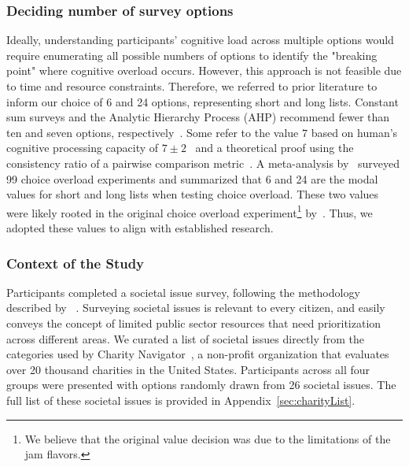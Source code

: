 \subsubsection{Deciding number of survey options}
Ideally, understanding participants' cognitive load across multiple options would require enumerating all possible numbers of options to identify the "breaking point" where cognitive overload occurs. However, this approach is not feasible due to time and resource constraints. Therefore, we referred to prior literature to inform our choice of 6 and 24 options, representing short and long lists. Constant sum surveys and the Analytic Hierarchy Process (AHP) recommend fewer than ten and seven options, respectively~\cite{moroneyQuestionnaireDesignHow2019, saatyGroupDecisionMaking2013, saatyPrinciplesAnalyticHierarchy1987}. Some refer to the value $7$ based on human's cognitive processing capacity of $7\pm2$~\cite{millerMagicalNumberSeven1956} and a theoretical proof using the consistency ratio of a pairwise comparison metric~\cite{saaty2003magic}. A meta-analysis by~\textcite{chernevChoiceOverloadConceptual2015} surveyed 99 choice overload experiments and summarized that 6 and 24 are the modal values for short and long lists when testing choice overload. These two values were likely rooted in the original choice overload experiment\footnote{We believe that the original value decision was due to the limitations of the jam flavors.} by~\textcite{iyengarWhenChoiceDemotivating2000}. Thus, we adopted these values to align with established research.

\subsubsection{Context of the Study}
Participants completed a societal issue survey, following the methodology described by ~\textcite{chengCanShowWhat2021}. Surveying societal issues is relevant to every citizen, and easily conveys the concept of limited public sector resources that need prioritization across different areas. We curated a list of societal issues directly from the categories used by Charity Navigator~\cite{CharityNavigator2023}, a non-profit organization that evaluates over 20 thousand charities in the United States. Participants across all four groups were presented with options randomly drawn from 26 societal issues. The full list of these societal issues is provided in Appendix~\ref{sec:charityList}.

